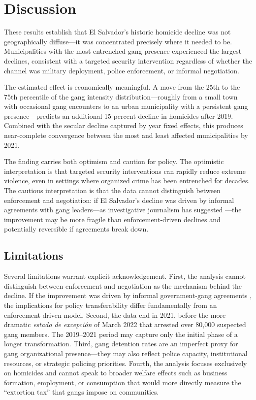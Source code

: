 \documentclass[12pt]{article}
\begin{document}
\section{Discussion}

These results establish that El Salvador's historic homicide decline was not geographically diffuse---it was concentrated precisely where it needed to be. Municipalities with the most entrenched gang presence experienced the largest declines, consistent with a targeted security intervention regardless of whether the channel was military deployment, police enforcement, or informal negotiation.

The estimated effect is economically meaningful. A move from the 25th to the 75th percentile of the gang intensity distribution---roughly from a small town with occasional gang encounters to an urban municipality with a persistent gang presence---predicts an additional 15 percent decline in homicides after 2019. Combined with the secular decline captured by year fixed effects, this produces near-complete convergence between the most and least affected municipalities by 2021.

The finding carries both optimism and caution for policy. The optimistic interpretation is that targeted security interventions can rapidly reduce extreme violence, even in settings where organized crime has been entrenched for decades. The cautious interpretation is that the data cannot distinguish between enforcement and negotiation: if El Salvador's decline was driven by informal agreements with gang leaders---as investigative journalism has suggested \citep{Martinez2020}---the improvement may be more fragile than enforcement-driven declines and potentially reversible if agreements break down.

\subsection{Limitations}

Several limitations warrant explicit acknowledgement. First, the analysis cannot distinguish between enforcement and negotiation as the mechanism behind the decline. If the improvement was driven by informal government-gang agreements \citep{Martinez2020}, the implications for policy transferability differ fundamentally from an enforcement-driven model. Second, the data end in 2021, before the more dramatic \textit{estado de excepci\'{o}n} of March 2022 that arrested over 80,000 suspected gang members. The 2019--2021 period may capture only the initial phase of a longer transformation. Third, gang detention rates are an imperfect proxy for gang organizational presence---they may also reflect police capacity, institutional resources, or strategic policing priorities. Fourth, the analysis focuses exclusively on homicides and cannot speak to broader welfare effects such as business formation, employment, or consumption that would more directly measure the ``extortion tax'' that gangs impose on communities.
\end{document}
